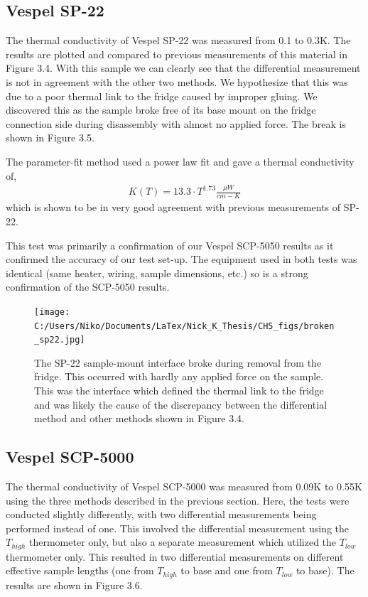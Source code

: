\documentclass{report}
\begin{document}
\subsection{Vespel SP-22}
The thermal conductivity of Vespel SP-22 was measured from 0.1 to 0.3K. The results are plotted and compared to previous measurements of this material in Figure 3.4. With this sample we can clearly see that the differential measurement is not in agreement with the other two methods. We hypothesize that this was due to a poor thermal link to the fridge caused by improper gluing. We discovered this as the sample broke free of its base mount on the fridge connection side during disassembly with almost no applied force. The break is shown in Figure 3.5.

The parameter-fit method used a power law fit and gave a thermal conductivity of,
\begin{eqnarray}
K(T) = 13.3 \cdot T^{1.73} \frac{\mu W}{cm-K}
\end{eqnarray}
which is shown to be in very good agreement with previous measurements of SP-22.

This test was primarily a confirmation of our Vespel SCP-5050 results as it confirmed the accuracy of our test set-up. The equipment used in both tests was identical (same heater, wiring, sample dimensions, etc.) so is a strong confirmation of the SCP-5050 results.

\begin{figure}
\texttt{[image: C:/Users/Niko/Documents/LaTex/Nick\_K\_Thesis/CH5\_figs/broken\_sp22.jpg]}
\caption{The SP-22 sample-mount interface broke during removal from the fridge. This occurred with hardly any applied force on the sample. This was the interface which defined the thermal link to the fridge and was likely the cause of the discrepancy between the differential method and other methods shown in Figure 3.4.}
\end{figure}

\subsection{Vespel SCP-5000}
The thermal conductivity of Vespel SCP-5000 was measured from 0.09K to 0.55K using the three methods described in the previous section. Here, the tests were conducted slightly differently, with two differential measurements being performed instead of one. This involved the differential measurement using the $T_{high}$ thermometer only, but also a separate measurement which utilized the $T_{low}$ thermometer only. This resulted in two differential measurements on different effective sample lengths (one from $T_{high}$ to base and one from $T_{low}$ to base). The results are shown in Figure 3.6.
\end{document}
